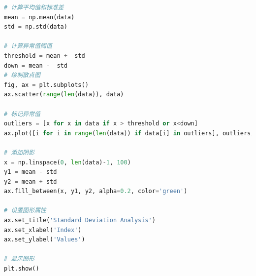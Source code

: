 \documentclass[UTF8]{article}
\begin{document}
\begin{appendix}
\begin{lstlisting}[language=python]
# 计算平均值和标准差
mean = np.mean(data)
std = np.std(data)

# 计算异常值阈值
threshold = mean +  std
down = mean -  std
# 绘制散点图
fig, ax = plt.subplots()
ax.scatter(range(len(data)), data)

# 标记异常值
outliers = [x for x in data if x > threshold or x<down]
ax.plot([i for i in range(len(data)) if data[i] in outliers], outliers, 'ro', alpha=0.5)

# 添加阴影
x = np.linspace(0, len(data)-1, 100)
y1 = mean - std
y2 = mean + std
ax.fill_between(x, y1, y2, alpha=0.2, color='green')

# 设置图形属性
ax.set_title('Standard Deviation Analysis')
ax.set_xlabel('Index')
ax.set_ylabel('Values')

# 显示图形
plt.show()

		\end{lstlisting}

\end{appendix}
\end{document}
